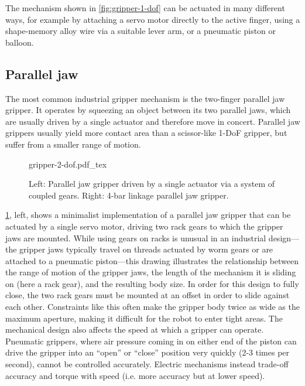 The mechanism shown in \cref{fig:gripper-1-dof} can be actuated in many different ways, for example by attaching a servo motor directly to the active finger, using a shape-memory alloy wire via a suitable lever arm, or a pneumatic piston or balloon.

\subsection{Parallel jaw}

The most common industrial gripper mechanism is the two-finger parallel jaw gripper. It operates by squeezing an object between its two parallel jaws, which are usually driven by a single actuator and therefore move in concert. Parallel jaw grippers usually yield more contact area than a scissor-like 1-DoF gripper, but suffer from a smaller range of motion.

\begin{figure}
\centering
    \def\svgwidth{\textwidth}
    {gripper-2-dof.pdf_tex}
    \caption{Left: Parallel jaw gripper driven by a single actuator via a system of coupled gears. Right: 4-bar linkage parallel jaw gripper.}\label{fig:paralleljaw}
\end{figure}

\cref{fig:paralleljaw}, left, shows a minimalist implementation of a parallel jaw gripper that can be actuated by a single servo motor, driving two rack gears to which the gripper jaws are mounted. While using gears on racks is unusual in an industrial design---the gripper jaws typically travel on threads actuated by worm gears or are attached to a pneumatic piston---this drawing illustrates the relationship between the range of motion of the gripper jaws, the length of the mechanism it is sliding on (here a rack gear), and the resulting body size. In order for this design to fully close, the two rack gears must be mounted at an offset in order to slide against each other. Constraints like this often make the gripper body twice as wide as the maximum aperture, making it difficult for the robot to enter tight areas. The mechanical design also affects the speed at which a gripper can operate. Pneumatic grippers, where air pressure coming in on either end of the piston can drive the gripper into an ``open'' or ``close'' position very quickly (2-3 times per second), cannot be controlled accurately. Electric mechanisms instead trade-off accuracy and torque with speed (i.e. more accuracy but at lower speed).

